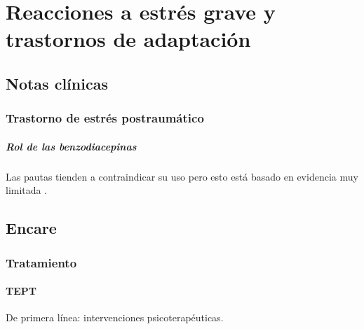 \chapter{Reacciones a estrés grave y trastornos de adaptación}
\section*{Notas clínicas}
\subsection*{Trastorno de estrés postraumático}
\paragraph{Rol de las benzodiacepinas}
Las pautas tienden a contraindicar su uso pero esto está basado en evidencia muy limitada \cite{starcevic2017no}.
\section*{Encare}
\subsection*{Tratamiento}
\subsubsection*{TEPT}
De primera línea: intervenciones psicoterapéuticas.
\printbibliography[]